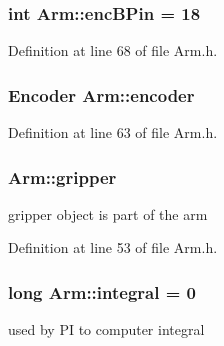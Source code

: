 \hypertarget{classArm_ab1111e111610b38214e703cd88887f24}{
\subsubsection[{enc\-B\-Pin}]{\setlength{\rightskip}{0pt plus 5cm}int Arm\-::enc\-B\-Pin = 18\hspace{0.3cm}{\ttfamily [private]}}}\label{classArm_ab1111e111610b38214e703cd88887f24}


Definition at line 68 of file Arm.\-h.

\hypertarget{classArm_afe912e5b20439c082abb66920658805c}{
\subsubsection[{encoder}]{\setlength{\rightskip}{0pt plus 5cm}Encoder Arm\-::encoder\hspace{0.3cm}{\ttfamily [private]}}}\label{classArm_afe912e5b20439c082abb66920658805c}


Definition at line 63 of file Arm.\-h.

\hypertarget{classArm_a1f237e56fc1e76c2b63f1f59d847945d}{
\subsubsection[{gripper}]{ Arm\-::gripper}}\label{classArm_a1f237e56fc1e76c2b63f1f59d847945d}


gripper object is part of the arm 



Definition at line 53 of file Arm.\-h.

\hypertarget{classArm_aef466ce8350e1d73ed9a7b529512e90c}{
\subsubsection[{integral}]{\setlength{\rightskip}{0pt plus 5cm}long Arm\-::integral = 0\hspace{0.3cm}{\ttfamily [private]}}}\label{classArm_aef466ce8350e1d73ed9a7b529512e90c}


used by P\-I to computer integral 



